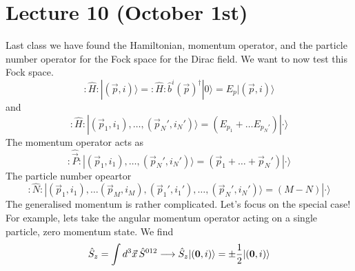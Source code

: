 \section{Lecture 10 (October 1st)}
\begin{thm}
Last class we have found the Hamiltonian, momentum operator, and the particle number operator for the Fock space for the Dirac field. We want to now test this Fock space. 
\[:\hat{H}:|(\vec{p},i)\rangle =:\hat{H}:\hat{b}^{i}(\vec{p})^{\dagger}|0\rangle =E_{p}|(\vec{p},i)\rangle \]
and
\[:\hat{H}:|(\vec{p}_{1},i_1),\ldots ,(\vec{p}_{N}',i_{N}')\rangle =(E_{p_1}+\ldots E_{p_{N}'})|\cdot \rangle \]
The momentum operator acts as
\[:\hat{\vec{P}}:|(\vec{p}_{1},i_1),\ldots ,(\vec{p}_{N}',i_{N}')\rangle =(\vec{p}_{1}+\ldots +\vec{p}_{N}')|\cdot \rangle \]
The particle number opeartor 
\[:\hat{N}:|(\vec{p}_{1},i_{1}),\ldots (\vec{p}_{M},i_{M}),(\vec{p}_{1}',i_{1}'),\ldots ,(\vec{p}_{N}',i_{N}')\rangle =(M-N)|\cdot \rangle \]
The generalised momentum is rather complicated. Let's focus on the special case! For example, lets take the angular momentum operator acting on a single particle, zero momentum state. We find
\[\hat{S}_{z}=\int d^3\vec{x}\,\hat{S}^{012}\longrightarrow \hat{S}_{z}|({\bf 0},i)\rangle =\pm \dfrac{1}{2}|({\bf 0},i)\rangle \]
\end{thm}
\vspace{2ex}

